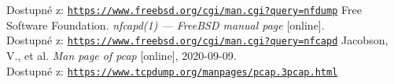 \documentclass[12pt]{article}
\begin{document}
\begin{thebibliography}{plain}
		Dostupné z: \href{https://www.freebsd.org/cgi/man.cgi?query=nfdump&apropos=0&sektion=1&manpath=FreeBSD+8.2-RELEASE+and+Ports&format=html}{\texttt{https://www.freebsd.org/cgi/man.cgi?query=nfdump}}
	 Free Software Foundation. 
		\emph{nfcapd(1) — FreeBSD manual page} [online].\\
		Dostupné z: \href{https://www.freebsd.org/cgi/man.cgi?query=nfcapd&apropos=0&sektion=1&manpath=FreeBSD+8.2-RELEASE+and+Ports&format=html}{\texttt{https://www.freebsd.org/cgi/man.cgi?query=nfcapd}}
	 Jacobson, V., et al. 
		\emph{Man page of pcap} [online], 2020-09-09.\\
		Dostupné z: \href{https://www.tcpdump.org/manpages/pcap.3pcap.html}{\texttt{https://www.tcpdump.org/manpages/pcap.3pcap.html}}

  \end{thebibliography}
\end{document}
